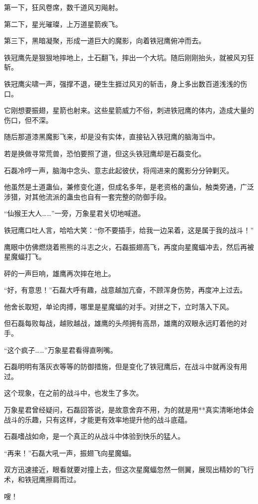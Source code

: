 \begin{this_body}
第一下，狂风卷席，数千道风刃飚射。

第二下，星光璀璨，上万道星箭疾飞。

第三下，黑暗凝聚，形成一道巨大的魔影，向着铁冠鹰俯冲而去。

铁冠鹰先是狠狠地摔地上，土石翻飞，摔出一个大坑。随后刚刚抬头，就被风刃狂斩。

铁冠鹰尖啸一声，强撑不退，硬生生捱过风刃的斩击，身上多出数百道浅浅的伤口。

它刚想要振翅，星箭也射来。这些星箭威力不俗，刺进铁冠鹰的体内，造成大量的伤口，但不深。

随后那道漆黑魔影飞来，却是没有实体，直接钻入铁冠鹰的脑海当中。

若是换做寻常荒兽，恐怕要照了道，但这头铁冠鹰却是石磊变化。

石磊冷哼一声，脑海中念头、意志此起彼伏，将闯进来的魔影分分钟剿灭。

他虽然是土道蛊仙，兼修变化道，但成名多年，是老资格的蛊仙，触类旁通，广泛涉猎，对其他流派的蛊虫也自有一套完整的防御手段。

“仙猴王大人……”一旁，万象星君关切地喊道。

铁冠鹰口吐人言，哈哈大笑：“你不要插手，给我一边呆着，这是属于我的战斗！”

鹰眼中仿佛燃烧着熊熊的斗志之火，石磊振翅高飞，再度向星魔蝠冲去，然后再被星魔蝠打飞。

砰的一声巨响，雄鹰再次摔在地上。

“好，有意思！”石磊大呼有趣，战意越加亢奋，不顾浑身伤势，再度冲上过去。

他舍长取短，单论肉搏，哪里是星魔蝠的对手。对拼之下，立时落入下风。

但石磊每败每战，越败越战，雄鹰的头颅拥有高昂，雄鹰的双眼永远盯着他的对手。

“这个疯子……”万象星君看得直咧嘴。

石磊明明有落灰衣等等的防御措施，但是变化了铁冠鹰后，在战斗中就再没有用过。

这个现象，在之前的战斗中，也发生了多次。

万象星君曾经疑问，石磊回答说，是故意舍弃不用，为的就是用**真实清晰地体会战斗的乐趣，只有这样，才能更有效率地提升他的战斗底蕴。

石磊嗜战如命，是一个真正的从战斗中体验到快乐的猛人。

“再来！”石磊大吼一声，振翅飞向星魔蝠。

双方迅速接近，眼看就要对撞上去，但这次星魔蝠忽然一侧翼，展现出精妙的飞行术，和铁冠鹰擦肩而过。

嗖！


\end{this_body}

